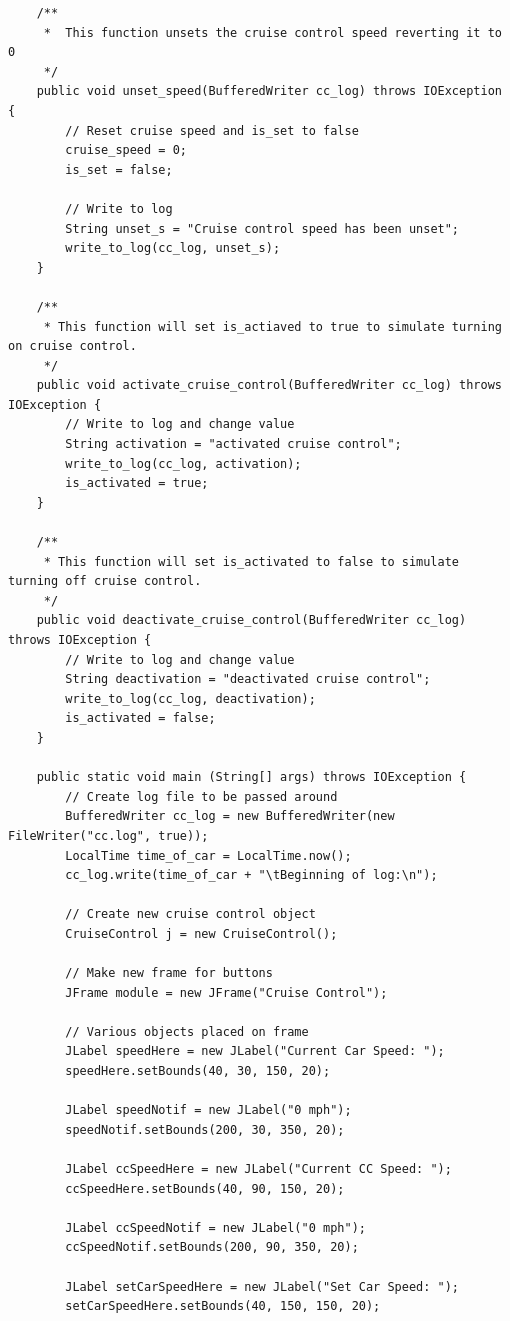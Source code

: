 \documentclass[preprint,11pt,3p]{article}
\begin{document}
\begin{lstlisting}
    /**
     * 	This function unsets the cruise control speed reverting it to 0
     */
    public void unset_speed(BufferedWriter cc_log) throws IOException {
    	// Reset cruise speed and is_set to false
    	cruise_speed = 0;
    	is_set = false;

    	// Write to log
    	String unset_s = "Cruise control speed has been unset";
    	write_to_log(cc_log, unset_s);
    }

    /**
     * This function will set is_actiaved to true to simulate turning on cruise control.
     */
    public void activate_cruise_control(BufferedWriter cc_log) throws IOException {
    	// Write to log and change value
    	String activation = "activated cruise control";
    	write_to_log(cc_log, activation);
        is_activated = true;
    }

    /**
     * This function will set is_activated to false to simulate turning off cruise control. 
     */
    public void deactivate_cruise_control(BufferedWriter cc_log) throws IOException {
    	// Write to log and change value
    	String deactivation = "deactivated cruise control";
    	write_to_log(cc_log, deactivation);
        is_activated = false;
    }

    public static void main (String[] args) throws IOException {
        // Create log file to be passed around
		BufferedWriter cc_log = new BufferedWriter(new FileWriter("cc.log", true));
		LocalTime time_of_car = LocalTime.now();
		cc_log.write(time_of_car + "\tBeginning of log:\n");
		
        // Create new cruise control object
        CruiseControl j = new CruiseControl();

        // Make new frame for buttons
        JFrame module = new JFrame("Cruise Control");

        // Various objects placed on frame
        JLabel speedHere = new JLabel("Current Car Speed: ");
        speedHere.setBounds(40, 30, 150, 20);

        JLabel speedNotif = new JLabel("0 mph");
        speedNotif.setBounds(200, 30, 350, 20);

        JLabel ccSpeedHere = new JLabel("Current CC Speed: ");
        ccSpeedHere.setBounds(40, 90, 150, 20);

        JLabel ccSpeedNotif = new JLabel("0 mph");
        ccSpeedNotif.setBounds(200, 90, 350, 20);

        JLabel setCarSpeedHere = new JLabel("Set Car Speed: ");
        setCarSpeedHere.setBounds(40, 150, 150, 20);


\end{lstlisting}
\end{document}
